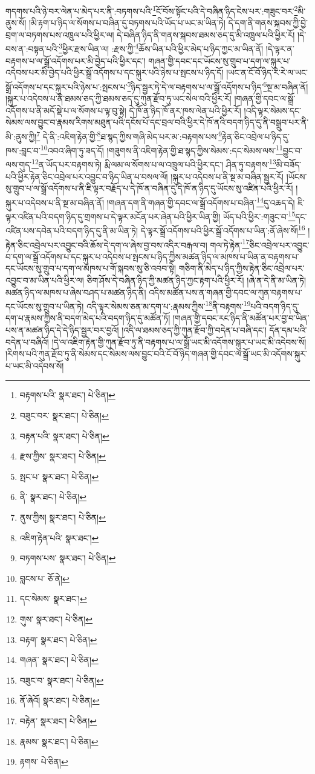 གདགས་པའི་ཉེ་བར་ལེན་པ་མེད་པར་ནི་:བཏགས་པའི་\footnote{བརྟགས་པའི་  སྣར་ཐང་།  པེ་ཅིན། }ངོ་བོས་སྟོང་པའི་དེ་བཞིན་ཉིད་ངེས་པར་:གཟུང་བར་\footnote{བཟུང་བར་  སྣར་ཐང་།  པེ་ཅིན། }མི་ནུས་སོ། །མི་རྟག་པ་ཉིད་ལ་སོགས་པ་བཞིན་དུ་བཏགས་པའི་ཡོད་པ་ཡང་མ་ཡིན་ཏེ། དེ་དག་ནི་གནས་སྐབས་ཀྱི་བྱེ་བྲག་ལ་བཏགས་པས་འཁྲུལ་པའི་ཕྱིར་ལ། དེ་བཞིན་ཉིད་ནི་གནས་སྐབས་ཐམས་ཅད་དུ་མི་འཁྲུལ་པའི་ཕྱིར་རོ། །དེ་བས་ན་:བསྟན་པའི་\footnote{བརྟན་པའི་  སྣར་ཐང་།  པེ་ཅིན། }ཕྱིར་རྫས་ཡིན་ལ། :རྫས་ཀྱི་\footnote{རྫས་ཀྱིས་  སྣར་ཐང་།  པེ་ཅིན། }ཆོས་ཡིན་པའི་ཕྱིར་མེད་པ་ཉིད་ཀྱང་མ་ཡིན་ནོ། །དེ་ལྟར་ན་བརྟགས་པ་ལ་སྒྲོ་འདོགས་པར་མི་བྱེད་པའི་ཕྱིར་དང་། གཞན་གྱི་དབང་དང་ཡོངས་སུ་གྲུབ་པ་དག་ལ་སྐུར་པ་འདེབས་པར་མི་བྱེད་པའི་ཕྱིར་སྒྲོ་འདོགས་པ་དང་སྐུར་པའི་ཉེས་པ་སྤངས་པ་ཉིད་དོ། །ཡང་ན་ངོ་བོ་ཉིད་རེ་རེ་ལ་ཡང་སྒྲོ་འདོགས་པ་དང་སྐུར་པའི་ཉེས་པ་:སྤངས་པ་\footnote{སྤང་པ་  སྣར་ཐང་།  པེ་ཅིན། }ཉིད་སྦྱར་ཏེ་དེ་ལ་བརྟགས་པ་ལ་སྒྲོ་འདོགས་པ་ཉིད་\footnote{ནི་  སྣར་ཐང་།  པེ་ཅིན། }སྔ་མ་བཞིན་ནོ། །སྐུར་པ་འདེབས་པ་ནི་ཐམས་ཅད་ཀྱི་ཐམས་ཅད་དུ་ཀུན་རྫོབ་ཏུ་ཡང་སེལ་བའི་ཕྱིར་རོ། །གཞན་གྱི་དབང་ལ་སྒྲོ་འདོགས་པ་ནི་མདོ་སྡེ་པ་ལ་སོགས་པ་ལྟ་བུ་སྟེ། དེ་ཁོ་ན་ཉིད་ཁོ་ནར་ཁས་ལེན་པའི་ཕྱིར་རོ། །འདི་ལྟར་སེམས་དང་སེམས་ལས་བྱུང་བ་རྣམས་རིགས་མཐུན་པའི་དངོས་པོ་དང་བྲལ་བའི་ཕྱིར་དེ་ཁོ་ནའི་བདག་ཉིད་དུ་ནི་བསྒྲུབ་པར་ནི་མི་:ནུས་ཀྱི།\footnote{ནུས་ཀྱིས།  སྣར་ཐང་།  པེ་ཅིན། } དེ་ནི་:འཇིག་རྟེན་གྱི་\footnote{འཇིག་རྟེན་པའི་  སྣར་ཐང་། }ཐ་སྙད་ཀྱིས་གཞི་མེད་པར་མ་:བརྟགས་པས་\footnote{བཏགས་པས་  སྣར་ཐང་།  པེ་ཅིན། }རྟེན་ཅིང་འབྲེལ་པ་ཉིད་དུ་ཁས་:བླང་བ་\footnote{བླངས་པ་  ཅོ་ནེ། }འབའ་ཞིག་ཏུ་ཟད་དོ། །གཟུགས་ནི་འཇིག་རྟེན་གྱི་ཐ་སྙད་ཀྱིས་སེམས་:དང་སེམས་ལས་\footnote{དང་སེམས་  སྣར་ཐང་། }བྱུང་བ་ལས་གུད་\footnote{གུས་  སྣར་ཐང་།  པེ་ཅིན། }ན་ཡོད་པར་བརྟགས་ཏེ། རྨི་ལམ་ལ་སོགས་པ་ལ་འཁྲུལ་པའི་ཕྱིར་དང་། ཤིན་ཏུ་བརྟགས་\footnote{བརྟག་  སྣར་ཐང་།  པེ་ཅིན། }མི་བཟོད་པའི་ཕྱིར་རྟེན་ཅིང་འབྲེལ་པར་འབྱུང་བ་ཉིད་ཡིན་པ་བསལ་ལོ། །སྐུར་པ་འདེབས་པ་ནི་སྔ་མ་བཞིན་སྦྱར་རོ། །ཡོངས་སུ་གྲུབ་པ་ལ་སྒྲོ་འདོགས་པ་ནི་ཇི་ལྟར་བརྗོད་པ་དེ་ཁོ་ན་བཞིན་དུ་དེ་ཁོ་ན་ཉིད་དུ་ཡོངས་སུ་འཛིན་པའི་ཕྱིར་རོ། །སྐུར་པ་འདེབས་པ་ནི་སྔ་མ་བཞིན་ནོ། །གཞན་དག་ནི་གཞན་གྱི་དབང་ལ་སྒྲོ་འདོགས་པ་བཞིན་\footnote{གཞན་  སྣར་ཐང་།  པེ་ཅིན། }དུ་འཆད་དེ། ཇི་ལྟར་འཛིན་པའི་བདག་ཉིད་དུ་གྲགས་པ་དེ་ལྟར་མངོན་པར་ཞེན་པའི་ཕྱིར་ཡིན་གྱི། ཡོད་པའི་ཕྱིར་:གཟུང་བ་\footnote{བཟུང་བ་  སྣར་ཐང་།  པེ་ཅིན། }དང་འཛིན་པས་དབེན་པའི་བདག་ཉིད་དུ་ནི་མ་ཡིན་ཏེ། དེ་ལྟར་སྒྲོ་འདོགས་པའི་ཕྱིར་སྒྲོ་འདོགས་པ་ཡིན་:ནོ་ཞེས་སོ།\footnote{ནོ་ཞེའོ།  སྣར་ཐང་།  པེ་ཅིན། } །རྟེན་ཅིང་འབྲེལ་པར་འབྱུང་བའི་ཆོས་དེ་དག་ལ་ཞེས་བྱ་བས་འདིར་བརྒལ་བ། གལ་ཏེ་རྟེན་\footnote{བརྟེན་  སྣར་ཐང་།  པེ་ཅིན། }ཅིང་འབྲེལ་པར་འབྱུང་བ་དག་ལ་སྒྲོ་འདོགས་པ་དང་སྐུར་པ་འདེབས་པ་སྤངས་པ་ཉིད་ཀྱིས་མཚན་ཉིད་ལ་མཁས་པ་ཡིན་ན་བརྟགས་པ་དང་ཡོངས་སུ་གྲུབ་པ་དག་ལ་མཁས་པ་གོ་སྐབས་སུ་ཅི་འབབ་སྟེ། གཅིག་ནི་མེད་པ་ཉིད་ཀྱིས་རྟེན་ཅིང་འབྲེལ་པར་འབྱུང་བ་མ་ཡིན་པའི་ཕྱིར་ལ། ཅིག་ཤོས་དེ་བཞིན་ཉིད་ཀྱི་མཚན་ཉིད་ཀྱང་རྟག་པའི་ཕྱིར་རོ། །ཞེ་ན་དེ་ནི་མ་ཡིན་ཏེ། མཚན་ཉིད་ལ་མཁས་པ་ཞེས་བཤད་པ་མཚན་ཉིད་ནི། འདིས་མཚོན་པས་ན་གཞན་གྱི་དབང་ལ་ཀུན་བརྟགས་པ་དང་ཡོངས་སུ་གྲུབ་པ་ཡིན་ཏེ། འདི་ལྟར་སེམས་ཅན་མ་དག་པ་:རྣམས་ཀྱིས་\footnote{རྣམས་  སྣར་ཐང་།  པེ་ཅིན། }ནི་བརྟགས་\footnote{རྟགས་  པེ་ཅིན། }པའི་བདག་ཉིད་དུ་དག་པ་རྣམས་ཀྱིས་ནི་བདག་མེད་པའི་བདག་ཉིད་དུ་མཚོན་ཏོ། །གཞན་གྱི་དབང་རང་ཉིད་ནི་མཚོན་པར་བྱ་བ་ཡིན་པས་ན་མཚན་ཉིད་དེ་དེ་ཉིད་སྦྱར་བར་བྱའོ། །འདི་ལ་ཐམས་ཅད་ཀྱི་ཀུན་རྫོབ་ཀྱི་བདེན་པ་བཞི་དང་། དོན་དམ་པའི་བདེན་པ་བཞིའོ། །དེ་ལ་འཇིག་རྟེན་གྱི་ཀུན་རྫོབ་ཏུ་ནི་བརྟགས་པ་ལ་སྒྲོ་ཡང་མི་འདོགས་སྐུར་པ་ཡང་མི་འདེབས་སོ། །རིགས་པའི་ཀུན་རྫོབ་ཏུ་ནི་སེམས་དང་སེམས་ལས་བྱུང་བའི་ངོ་བོ་ཉིད་གཞན་གྱི་དབང་ལ་སྒྲོ་ཡང་མི་འདོགས་སྐུར་པ་ཡང་མི་འདེབས་སོ། 